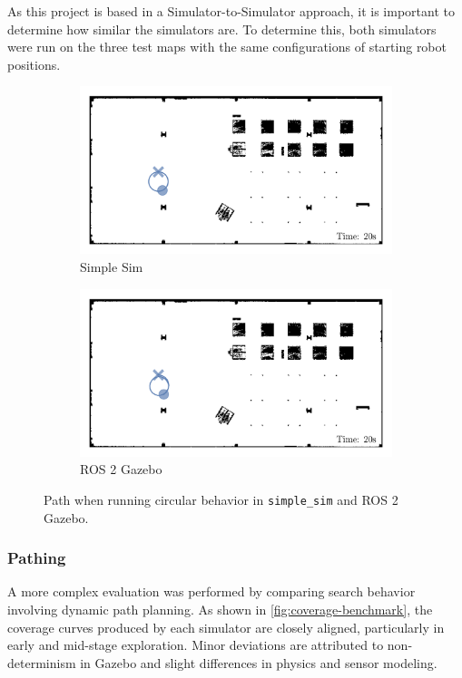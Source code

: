 As this project is based in a Simulator-to-Simulator approach, it is important to determine how similar the simulators are. To determine this, both simulators were run on the three test maps with the same configurations of starting robot positions.

\begin{figure}[H]
  \centering
  \begin{subfigure}[b]{0.45\textwidth}
    \centering
    \includegraphics[width=\textwidth]{./figures/plots/consistency/simple-sim-paths-(after-20s).png}
    \caption{Simple Sim}
  \end{subfigure}
  \begin{subfigure}[b]{0.45\textwidth}
    \centering
    \includegraphics[width=\textwidth]{./figures/plots/consistency/ros-2-paths-(after-20s).png}
    \caption{ROS 2 Gazebo}
  \end{subfigure}
  \caption{Path when running circular behavior in \texttt{simple\_sim} and ROS 2 Gazebo.}
  \label{fig:movement-consistency}
\end{figure}

\subsubsection{Pathing}
A more complex evaluation was performed by comparing search behavior involving dynamic path planning. As shown in \cref{fig:coverage-benchmark}, the coverage curves produced by each simulator are closely aligned, particularly in early and mid-stage exploration. Minor deviations are attributed to non-determinism in Gazebo and slight differences in physics and sensor modeling.

